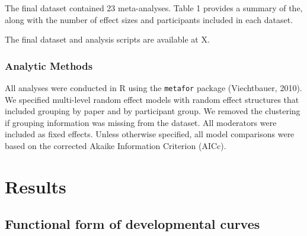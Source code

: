 \documentclass[10pt, letterpaper]{article}
\begin{document}
The final dataset contained 23 meta-analyses. Table 1 provides a summary
of the, along with the number of effect sizes and participants included
in each dataset.

The final dataset and analysis scripts are available at X.

\hypertarget{analytic-methods}{%
\subsubsection{Analytic Methods}\label{analytic-methods}}

All analyses were conducted in R using the \texttt{metafor} package
(Viechtbauer, 2010). We specified multi-level random effect models with
random effect structures that included grouping by paper and by
participant group. We removed the clustering if grouping information was
missing from the dataset. All moderators were included as fixed effects.
Unless otherwise specified, all model comparisons were based on the
corrected Akaike Information Criterion (AICc).

\hypertarget{results}{%
\section{Results}\label{results}}

\hypertarget{functional-form-of-developmental-curves}{%
\subsection{Functional form of developmental
curves}\label{functional-form-of-developmental-curves}}
\end{document}
